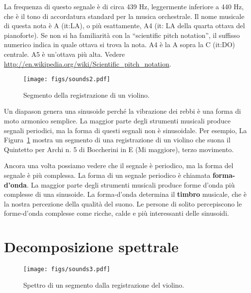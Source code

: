 \documentclass[12pt]{book} \usepackage[width=5.5in,height=8.5in, hmarginratio=3:2,vmarginratio=1:1]{geometry}
\begin{document}
La frequenza di questo segnale è di circa 439 Hz, leggermente inferiore a 440 Hz, che è il tono di accordatura standard per la musica orchestrale. Il nome musicale di questa nota è A (it:LA), o più esattamente, A4 (it: LA della quarta ottava del pianoforte). Se non si ha familiarità con la ``scientific pitch notation'', il suffisso numerico indica in quale ottava si trova la nota. A4 è la A sopra la C (it:DO) centrale. A5 è un'ottava più alta. Vedere \url{http://en.wikipedia.org/wiki/Scientific_pitch_notation}.

\begin{figure} 

\centerline{\texttt{[image: figs/sounds2.pdf]}} \caption{Segmento della registrazione di un violino.} \label{fig.sounds2} \end{figure} 

Un diapason genera una sinusoide perché la vibrazione dei rebbi è una forma di moto armonico semplice. La maggior parte degli strumenti musicali produce segnali periodici, ma la forma di questi segnali non è sinusoidale. Per esempio, La Figura~\ref{fig.sounds2} mostra un segmento di una registrazione di un violino che suona il Quintetto per Archi n. 5 di Boccherini in E (Mi maggiore), terzo movimento.

Ancora una volta possiamo vedere che il segnale è periodico, ma la forma del segnale è più complessa. La forma di un segnale periodico è chiamata {\bf forma-d'onda}. La maggior parte degli strumenti musicali produce forme d'onda più complesse di una sinusoide. La forma-d'onda determina il {\bf timbro} musicale, che è la nostra percezione della qualità del suono. Le persone di solito percepiscono le forme-d'onda complesse come ricche, calde e più interessanti delle sinusoidi.

\section{Decomposizione spettrale} 

\begin{figure} 

\centerline{\texttt{[image: figs/sounds3.pdf]}} \caption{Spettro di un segmento dalla registrazione del violino.} \label{fig.sounds3} \end{figure} 
\end{document}
